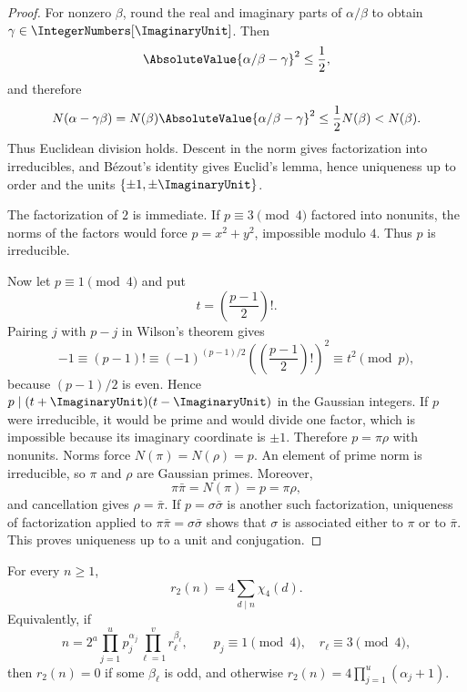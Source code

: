 \begin{proof}
For nonzero $\beta$, round the real and imaginary parts of $\alpha/\beta$
to obtain $\gamma\in\IntegerNumbers[\ImaginaryUnit]$.  Then
\[
 \AbsoluteValue{\alpha/\beta-\gamma}^2\le\frac12,
\]
and therefore
\[
 N(\alpha-\gamma\beta)
 =N(\beta)\AbsoluteValue{\alpha/\beta-\gamma}^2
 \le\frac12N(\beta)<N(\beta).
\]
Thus Euclidean division holds.  Descent in
the norm gives factorization into irreducibles, and B\'ezout's identity gives
Euclid's lemma, hence uniqueness up to order and the units
$\{\pm1,\pm\ImaginaryUnit\}$.

The factorization of $2$ is immediate.  If $p\equiv3\pmod4$ factored into
nonunits, the norms of the factors would force $p=x^2+y^2$, impossible
modulo $4$.  Thus $p$ is irreducible.

Now let $p\equiv1\pmod4$ and put
\[
 t=\left(\frac{p-1}{2}\right)!.
\]
Pairing $j$ with $p-j$ in Wilson's theorem gives
\[
 -1\equiv(p-1)!
 \equiv(-1)^{(p-1)/2}
 \left(\left(\frac{p-1}{2}\right)!\right)^2
 \equiv t^2\pmod p,
\]
because $(p-1)/2$ is even.  Hence
$p\mid(t+\ImaginaryUnit)(t-\ImaginaryUnit)$ in the Gaussian integers.
If $p$ were irreducible, it would be prime and would divide one factor, which
is impossible because its imaginary coordinate is $\pm1$.  Therefore
$p=\pi\rho$ with nonunits.  Norms force
$N(\pi)=N(\rho)=p$.  An element of prime norm is irreducible, so $\pi$ and
$\rho$ are Gaussian primes.  Moreover,
\[
 \pi\bar\pi=N(\pi)=p=\pi\rho,
\]
and cancellation gives $\rho=\bar\pi$.  If
$p=\sigma\bar\sigma$ is another such factorization, uniqueness of
factorization applied to $\pi\bar\pi=\sigma\bar\sigma$ shows that $\sigma$
is associated either to $\pi$ or to $\bar\pi$.  This proves uniqueness up to
a unit and conjugation.
\end{proof}

\begin{theorem}
\label{qg:thm-two-square}
For every $n\ge1$,
\begin{equation}
 r_2(n)=4\sum_{d\mid n}\chi_4(d).
\label{eq:qg-two-square}
\end{equation}
Equivalently, if
\[
 n=2^a\prod_{j=1}^{u}p_j^{\alpha_j}
       \prod_{\ell=1}^{v}r_\ell^{\beta_\ell},
 \qquad
 p_j\equiv1\pmod4,\quad r_\ell\equiv3\pmod4,
\]
then $r_2(n)=0$ if some $\beta_\ell$ is odd, and otherwise
$r_2(n)=4\prod_{j=1}^{u}(\alpha_j+1)$.
\end{theorem}

